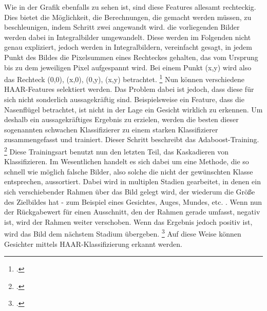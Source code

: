 \documentclass[12pt, a4paper]{report}
\begin{document}
Wie in der Grafik ebenfalls zu sehen ist, sind diese Features allesamt rechteckig. Dies bietet die Möglichkeit, die Berechnungen, die gemacht werden müssen, zu beschleunigen, indem Schritt zwei angewandt wird. die vorliegenden Bilder werden dabei in Integralbilder umgewandelt. Diese werden im Folgenden nicht genau expliziert, jedoch werden in Integralbildern, vereinfacht gesagt, in jedem Punkt des Bildes die Pixelsummen eines Rechteckes gehalten, das vom Ursprung bis zu dem jeweiligen Pixel aufgespannt wird. Bei einem Punkt (x,y) wird also das Rechteck (0,0), (x,0), (0,y), (x,y) betrachtet.
\footcite[Vgl.][]{integral}
Nun können verschiedene HAAR-Features selektiert werden. Das Problem dabei ist jedoch, dass diese für sich nicht sonderlich aussagekräftig sind. Beispielsweise ein Feature, dass die Nasenflügel betrachtet, ist nicht in der Lage ein Gesicht wirklich zu erkennen. Um deshalb ein aussagekräftiges Ergebnis zu erzielen, werden die besten dieser sogenannten schwachen Klassifizierer zu einem starken Klassifizierer zusammengefasst und trainiert. Dieser Schritt beschreibt das Adaboost-Training.
\footcite[Vgl.][]{willberger}
Diese Trainingsart benutzt nun den letzten Teil, das Kaskadieren von Klassifizieren. Im Wesentlichen handelt es sich dabei um eine Methode, die so schnell wie möglich falsche Bilder, also solche die nicht der gewünschten Klasse entsprechen, aussortiert. Dabei wird in multiplen Stadien gearbeitet, in denen ein sich verschiebender Rahmen über das Bild gelegt wird, der wiederum die Größe des Zielbildes hat - zum Beispiel eines Gesichtes, Auges, Mundes, etc. . Wenn nun der Rückgabewert für einen Ausschnitt, den der Rahmen gerade umfasst, negativ ist, wird der Rahmen weiter verschoben. Wenn das Ergebnis jedoch positiv ist, wird das Bild dem nächstem Stadium übergeben.
\footcite[Vgl.][]{willberger}
Auf diese Weise können Gesichter mittels HAAR-Klassifizierung erkannt werden.
\end{document}
